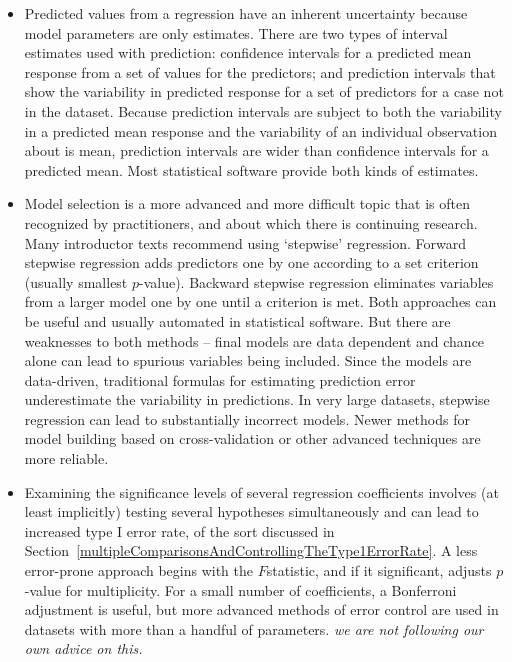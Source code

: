 \begin{itemize}
	
	\item Predicted values from a regression have an inherent uncertainty because model parameters are only estimates.  There are two types of interval estimates used with prediction: confidence intervals for a predicted mean response from a set of values for the predictors; and prediction intervals that show the variability in predicted response for a set of predictors for a case not in the dataset.  Because prediction intervals are subject to both the variability in a predicted mean response and the variability of an individual observation about is mean, prediction intervals are wider than confidence intervals for a predicted mean.  Most statistical software provide both kinds of estimates.
	
	\item Model selection is a more advanced and more difficult topic that is often recognized by practitioners, and about which there is continuing research.  Many introductor texts recommend using `stepwise' regression.  Forward stepwise regression adds predictors one by one according to a set criterion (usually smallest $p$-value).  Backward stepwise regression eliminates variables from a larger model one by one until a criterion is met. Both approaches can be useful and usually automated in statistical software.  But there are weaknesses to both methods -- final models are data dependent and chance alone can lead to spurious variables being included.  Since the models are data-driven, traditional formulas for estimating prediction error underestimate the variability in predictions. In very large datasets, stepwise regression can lead to substantially incorrect models. Newer methods for model building based on cross-validation or other advanced techniques are more reliable.
	
	\item  Examining the significance levels of several regression coefficients involves (at least implicitly) testing several hypotheses simultaneously and can lead to increased type I error rate, of the sort discussed in Section~\ref{multipleComparisonsAndControllingTheType1ErrorRate}.  A less error-prone approach begins with the $F$statistic, and if it significant, adjusts $p$-value for multiplicity. For a small number of coefficients, a Bonferroni adjustment is useful, but more advanced methods of error control are used in datasets with more than a handful of parameters.  \textit{we are not following our own advice on this.}
	
\end{itemize}


